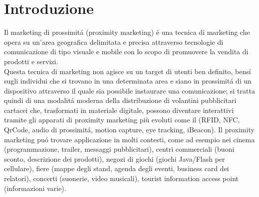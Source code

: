 
\pagestyle{fancy}
\makeatletter
\newcommand{\unchapter}[1]{%
  \begingroup
  \let\@makechapterhead\@gobble %
  \chapter{#1}
  \endgroup
}
\makeatother
\chapter*{Introduzione}
\vspace{4em}


Il marketing di prossimitá (proximity marketing) é una tecnica di marketing che opera su un'area geografica delimitata e precisa attraverso tecnologie di comunicazione di tipo visuale e mobile con lo scopo di promuovere la vendita di prodotti e servizi.\\[0.2cm]

Questa tecnica di marketing non agisce su un target di utenti ben definito, bensí sugli individui che si trovano in una determinata area e siano in prossimitá di un dispositivo attraverso il quale sia possibile instaurare una comunicazione; si tratta quindi di una modalitá moderna della distribuzione di volantini pubblicitari cartacei che, trasformati in materiale digitale, possono diventare interattivi tramite gli apparati di proximity marketing più evoluti come il (RFID, NFC, QrCode, audio di prossimitá, motion capture, eye tracking, iBeacon).
Il proximity marketing puó trovare applicazione in molti contesti, come ad esempio nei cinema (programmazione, trailer, messaggi pubblicitari), centri commerciali (buoni sconto, descrizione dei prodotti), negozi di giochi (giochi Java/Flash per cellulare), fiere (mappe degli stand, agenda degli eventi, business card dei relatori), concerti (suonerie, video musicali), tourist information access point (informazioni varie).\\[0.2cm]

